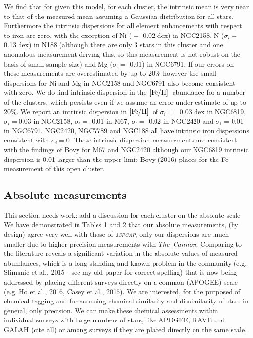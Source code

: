 \documentclass[14pt, preprint2]{aastex6}
\newcommand{\project}[1]{\textsl{#1}}
\newcommand{\tc}{\project{The~Cannon}}
\newcommand{\aspcap}{\project{\textsc{aspcap}}}
\newcommand{\feh}{\mbox{$\rm [Fe/H]$}}
\begin{document}
We find that for given this model, for each cluster, the intrinsic mean is very near to that of the measured mean assuming a Gaussian distribution for all stars. Furthermore the intrinsic dispersions for all element enhancements with respect to iron are zero, with the exception of Ni ($=$ 0.02 dex) in NGC2158, N ($\sigma_i$$=$ 0.13 dex) in N188 (although there are only 3 stars in this cluster and one anomalous measurement driving this, so this measurement is not robust on the basis of small sample size) and Mg ($\sigma_i$$=$ 0.01) in NGC6791. If our errors on these measurements are overestimated by up to 20\% however the small dispersions for Ni and Mg in NGC2158 and NGC6791 also become consistent with zero. We do find intrinsic dispersion in the \feh\ abundance for a number of the clusters, which persists even if we assume an error under-estimate of up to 20\%. We report an intrinsic dispersion in \feh\ of $\sigma_i$ $=$ 0.03 dex in NGC6819, $\sigma_i$$=$0.03 in NGC2158, $\sigma_i$$=$ 0.01 in M67,  $\sigma_i$$=$ 0.02 in NGC2420 and $\sigma_i$ = 0.01 in NGC6791. NGC2420, NGC7789 and NGC188 all have intrinsic iron dispersions consistent with  $\sigma_i$$=$0. These intrinsic dispersion measurements are consistent with the findings of Bovy for M67 and NGC2420 although our NGC6819 intrinsic dispersion is 0.01 larger than the upper limit Bovy (2016) places for the Fe measurement of this open cluster. 


\subsection{Absolute measurements}
This section needs work: add a discussion for each cluster on the absolute scale \\ 

We have demonstrated in Tables 1 and 2 that our absolute measurements, (by design) agree very well with those of \aspcap, only our dispersions are much smaller due to higher precision measurements with \tc. Comparing to the literature reveals a significant variation in the absolute values of measured abundances, which is a long standing and known problem in the community  (e.g. Slimanic et al., 2015 - see my old paper for correct spelling) that is now being addressed by placing different surveys directly on a common (APOGEE) scale (e.g. Ho et al., 2016, Casey et al., 2016). We are interested, for the purposed of chemical tagging and for assessing chemical similarity and dissimilarity of stars in general, only precision. We can make these chemical assessments within individual surveys with large numbers of stars, like APOGEE, RAVE and GALAH (cite all) or among surveys if they are placed directly on the same scale. 
\end{document}
